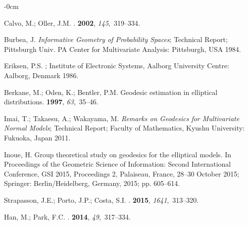 \documentclass[entropy,article,accept,oneauthor,pdftex,entropy]{Definitions/mdpi}
\begin{document}
\begin{adjustwidth}{-\extralength}{0cm}
\begin{thebibliography}{999}
Calvo, M.; Oller, J.M.
.
 {\bf 2002},
  {\em 145},~319--334.

Burbea, J.
\newblock\emph{ Informative Geometry of Probability Spaces};
\newblock Technical Report; {Pittsburgh Univ. PA Center for Multivariate
  Analysis: Pittsburgh, USA} %
1984.

Eriksen, P.S.
; {Institute of Electronic Systems, Aalborg University Centre: Aalborg, Denmark}%
   1986.

Berkane, M.; Oden, K.; Bentler, P.M.
\newblock Geodesic estimation in elliptical distributions.
 {\bf 1997}, {\em 63},~35--46.

Imai, T.; Takaesu, A.; Wakayama, M.
\newblock \emph{Remarks on Geodesics for Multivariate Normal Models};
\newblock Technical Report; {Faculty of Mathematics, Kyushu University: Fukuoka, Japan}  2011.%

Inoue, H.
\newblock Group theoretical study on geodesics for the elliptical models.
\newblock In Proceedings of the Geometric Science of Information: Second
  International Conference, GSI 2015, Proceedings 2, Palaiseau, France, 28--30 October 2015;
  Springer: {Berlin/Heidelberg, Germany,} %
 2015; pp. 605--614.

Strapasson, J.E.; Porto, J.P.; Costa, S.I.
.
 {\bf 2015}, {\em 1641},~313--320.

Han, M.; Park, F.C.
.
 {\bf 2014}, {\em
  49},~317--334.


\end{thebibliography}
\end{adjustwidth}
\end{document}
